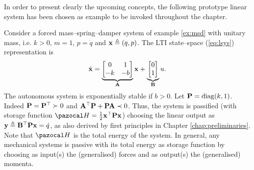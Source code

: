 %
In order to present clearly the upcoming concepts, the following prototype linear system has been chosen as example to be invoked throughout the chapter.
%
\begin{exmp}\label{ex:msd_MES}
    Consider a forced mass--spring--damper system of example \ref{ex:msd} with unitary mass, i.e. $k>0$, $m = 1$, $p = \dot{q}$ and $\mathbf{x}\triangleq (q,p)$.
    The LTI state--space (\ref{eq:lsys}) representation is
    \begin{equation}
        \dot{\mathbf{x}} = \underbrace{\begin{bmatrix}0&1\\-k&-b\end{bmatrix}}_{\mathbf{A}}\mathbf{x}+ \underbrace{\begin{bmatrix}0\\1\end{bmatrix}}_{\mathbf{B}}u.
    \end{equation}
    The autonomous system is exponentially stable if $b>0$. Let $\mathbf{P}=\operatorname{diag}({k,1})$. Indeed $\mathbf{P}=\mathbf{P}^\top\succ0$ and $\mathbf{A}^\top\mathbf{P}+\mathbf{P}\mathbf{A}\prec0$. Thus, the system is passified (with storage function $\Ha = \frac{1}{2}\xb^\top \Pb\xb$) choosing the linear output as $\mathbf{y} \triangleq \mathbf{B}^\top \mathbf{P}\mathbf{x} = \dot{q}$, as also derived by first principles in Chapter \ref{chap:preliminaries}. Note that $\Ha$ is the total energy of the system. In general, any mechanical systems is passive with its total energy as storage function by choosing as input(s) the (generalised) forces and as output(s) the (generalised) momenta.
\end{exmp}
%
